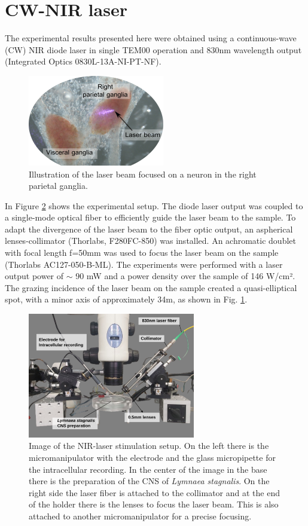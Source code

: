 \section{CW-NIR laser}
The experimental results presented here were obtained using a continuous-wave (CW) NIR diode laser in single TEM00 operation and 830nm wavelength output (Integrated Optics 0830L-13A-NI-PT-NF). 
\begin{figure}
    \centering
	\includegraphics{img/laser/laser-beam.png}
	\caption{Illustration of the laser beam focused on a neuron in the right parietal ganglia.}
	\label{fig:laser beam}
\end{figure} 
In Figure \ref{fig:laser setup} shows the experimental setup. The diode laser output was coupled to a single-mode optical fiber to efficiently guide the laser beam to the sample. To adapt the divergence of the laser beam to the fiber optic output, an aspherical lenses-collimator (Thorlabs, F280FC-850) was installed. An achromatic doublet with focal length f=50mm was used to focus the laser beam on the sample (Thorlabs AC127-050-B-ML). The experiments were performed with a laser output power of $\sim$ 90 mW and a power density over the sample of 146 W/cm². The grazing incidence of the laser beam on the sample created a quasi-elliptical spot, with a minor axis of approximately 34{\textmu}m, as shown in Fig. \ref{fig:laser beam}.

\begin{figure}[htb!]
	\centering
	\includegraphics[width=0.65\textwidth]{img/methods/laser-setup_labels.png}
	\caption{Image of the NIR-laser stimulation setup. On the left there is the micromanipulator with the electrode and the glass micropipette for the intracellular recording. In the center of the image in the base there is the preparation of the CNS of \textit{Lymnaea stagnalis}. On the right side the laser fiber is attached to the collimator and at the end of the holder there is the lenses to focus the laser beam. This is also attached to another micromanipulator for a precise focusing.}
	\label{fig:laser setup}
\end{figure}

